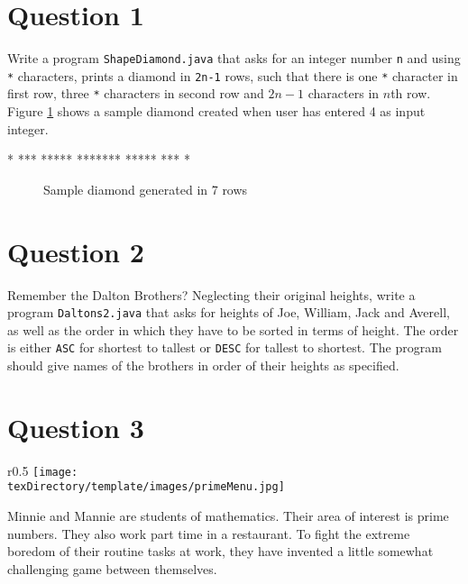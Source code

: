 \documentclass[12pt,letterpaper,twoside]{article}
\begin{document}

\section*{Question 1}

Write a program \texttt{ShapeDiamond.java} that asks for an integer number \texttt{n} and using \texttt{*} characters, prints a diamond in \texttt{2n-1} rows, such that there is one \texttt{*} character in first row, three \texttt{*} characters in second row and $2n-1$ characters in $n$th row.
Figure \ref{fig1} shows a sample diamond created when user has entered 4 as input integer.
\begin{verbbox}
   *
  ***
 *****
*******
 *****
  ***
   *
\end{verbbox}
\begin{figure}[H]\centering
\theverbbox
\caption{Sample diamond generated in 7 rows} \label{fig1}
\end{figure}

\section*{Question 2}

Remember the Dalton Brothers? Neglecting their original heights, write a program \texttt{Daltons2.java} that asks for heights of Joe, William, Jack and Averell, as well as the order in which they have to be sorted in terms of height. The order is either \texttt{ASC} for shortest to tallest or \texttt{DESC} for tallest to shortest. The program should give names of the brothers in order of their heights as specified.
\newpage

\section*{Question 3}

\begin{wrapfigure}{r}{0.5\textwidth}
\centering
\texttt{[image: \\texDirectory/template/images/primeMenu.jpg]}
\end{wrapfigure}

Minnie and Mannie are students of mathematics. Their area of interest is prime numbers. They also work part time in a restaurant. To fight the extreme boredom of their routine tasks at work, they have invented a little somewhat challenging game between themselves.
\end{document}

